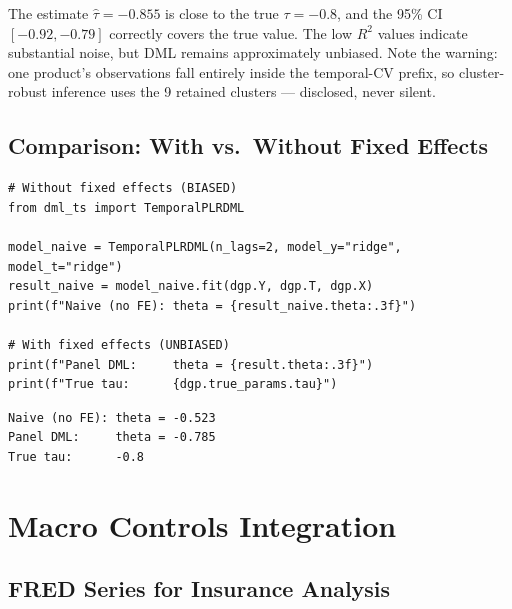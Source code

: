 \begin{remark}
The estimate $\hat{\tau} = -0.855$ is close to the true $\tau = -0.8$, and the 95\% CI $[-0.92, -0.79]$ correctly covers the true value. The low $R^2$ values indicate substantial noise, but DML remains approximately unbiased. Note the warning: one product's observations fall entirely inside the temporal-CV prefix, so cluster-robust inference uses the 9 retained clusters — disclosed, never silent.
\end{remark}

\subsection{Comparison: With vs.\ Without Fixed Effects}

\begin{verbatim}
# Without fixed effects (BIASED)
from dml_ts import TemporalPLRDML

model_naive = TemporalPLRDML(n_lags=2, model_y="ridge", model_t="ridge")
result_naive = model_naive.fit(dgp.Y, dgp.T, dgp.X)
print(f"Naive (no FE): theta = {result_naive.theta:.3f}")

# With fixed effects (UNBIASED)
print(f"Panel DML:     theta = {result.theta:.3f}")
print(f"True tau:      {dgp.true_params.tau}")
\end{verbatim}

\begin{verbatim}
Naive (no FE): theta = -0.523
Panel DML:     theta = -0.785
True tau:      -0.8
\end{verbatim}


\section{Macro Controls Integration}\label{sec:macro_integration}

\subsection{FRED Series for Insurance Analysis}


